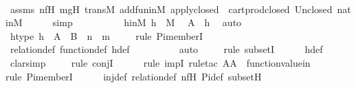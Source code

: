 \begin{isabellebody}
\ \ \ \ \isamarkupfalse%
\ assms\ nfH\ mgH\ transM\ add{\isacharunderscore}{\kern0pt}fun{\isacharunderscore}{\kern0pt}in{\isacharunderscore}{\kern0pt}M\ apply{\isacharunderscore}{\kern0pt}closed\ \ cartprod{\isacharunderscore}{\kern0pt}closed\ Un{\isacharunderscore}{\kern0pt}closed\ nat{\isacharunderscore}{\kern0pt}in{\isacharunderscore}{\kern0pt}M\isanewline
\ \ \ \ \isamarkupfalse%
\ simp\isanewline
\ \ \ \ \isamarkupfalse%
\isanewline
\ \ \isamarkupfalse%
\ \isamarkupfalse%
\ hinM{\isacharcolon}{\kern0pt}\ {\isachardoublequoteopen}h\ {\isasymin}\ M{\isachardoublequoteclose}\ \isamarkupfalse%
\ {\isacartoucheopen}{\isacharquery}{\kern0pt}A\ {\isacharequal}{\kern0pt}\ h{\isacartoucheclose}\ \isamarkupfalse%
\ auto\isanewline
\isanewline
\ \ \isamarkupfalse%
\ htype{\isacharcolon}{\kern0pt}\ {\isachardoublequoteopen}h\ {\isasymin}\ A\ {\isasymunion}\ B\ {\isasymrightarrow}\ n\ {\isacharhash}{\kern0pt}{\isacharplus}{\kern0pt}\ m{\isachardoublequoteclose}\isanewline
\ \ \ \ \isamarkupfalse%
{\isacharparenleft}{\kern0pt}rule\ Pi{\isacharunderscore}{\kern0pt}memberI{\isacharparenright}{\kern0pt}\isanewline
\ \ \ \ \isamarkupfalse%
\ relation{\isacharunderscore}{\kern0pt}def\ function{\isacharunderscore}{\kern0pt}def\ h{\isacharunderscore}{\kern0pt}def\ \isanewline
\ \ \ \ \ \ \ \isamarkupfalse%
\ auto{\isacharbrackleft}{\kern0pt}{}{\isacharbrackright}{\kern0pt}\isanewline
\ \ \ \ \isamarkupfalse%
{\isacharparenleft}{\kern0pt}rule\ subsetI{\isacharparenright}{\kern0pt}\isanewline
\ \ \ \ \isamarkupfalse%
\ h{\isacharunderscore}{\kern0pt}def\isanewline
\ \ \ \ \isamarkupfalse%
\ clarsimp\isanewline
\ \ \ \ \isamarkupfalse%
{\isacharparenleft}{\kern0pt}rule\ conjI{\isacharparenright}{\kern0pt}\isanewline
\ \ \ \ \ \isamarkupfalse%
{\isacharparenleft}{\kern0pt}rule\ impI{\isacharcomma}{\kern0pt}\ rule{\isacharunderscore}{\kern0pt}tac\ A{\isacharequal}{\kern0pt}A\ \ function{\isacharunderscore}{\kern0pt}value{\isacharunderscore}{\kern0pt}in{\isacharparenright}{\kern0pt}\isanewline
\ \ \ \ \ \ \isamarkupfalse%
{\isacharparenleft}{\kern0pt}rule\ Pi{\isacharunderscore}{\kern0pt}memberI{\isacharparenright}{\kern0pt}\isanewline
\ \ \ \ \isamarkupfalse%
\ inj{\isacharunderscore}{\kern0pt}def\ relation{\isacharunderscore}{\kern0pt}def\ nfH\ Pi{\isacharunderscore}{\kern0pt}def\ subsetH\isanewline

\end{isabellebody}
